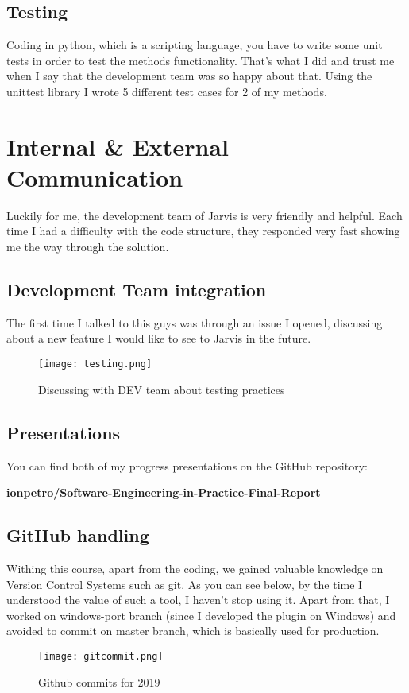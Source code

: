 \documentclass[12pt]{article}
\begin{document}
  \subsection{Testing}
  
    Coding in python, which is a scripting language, you have to write some unit tests in order to test the methods functionality. That's what I did and trust me when I say that the development team was so happy about that. Using the unittest library I wrote 5 different test cases for 2 of my methods.
  
\section{Internal \& External Communication}

    Luckily for me, the development team of Jarvis is very friendly and helpful. Each time I had a difficulty with the code structure, they responded very fast showing me the way through the solution.
 
  \subsection{Development Team integration}
  
    The first time I talked to this guys was through an issue I opened, discussing about a new feature I would like to see to Jarvis in the future.
    
\begin{figure}[tph!]
\centerline{\texttt{[image: testing.png]}}
  \caption{Discussing with DEV team about testing practices}
  \label{fig:verticalcell}
\end{figure}
  
  \subsection{Presentations}
  
  You can find both of my progress presentations on the GitHub repository: \\
  
  \centerline{
  \textbf{ionpetro/Software-Engineering-in-Practice-Final-Report}
  }
  
  \subsection{GitHub handling}
  
  Withing this course, apart from the coding, we gained valuable knowledge on Version Control Systems such as git. As you can see below, by the time I understood the value of such a tool, I haven't stop using it. Apart from that, I worked on windows-port branch (since I developed the plugin on Windows) and avoided to commit on master branch, which is basically used for production. 
\begin{figure}[h]
\centerline{\texttt{[image: gitcommit.png]}}
  \caption{Github commits for 2019}
  \label{fig:verticalcell}
\end{figure}
  
\end{document}
